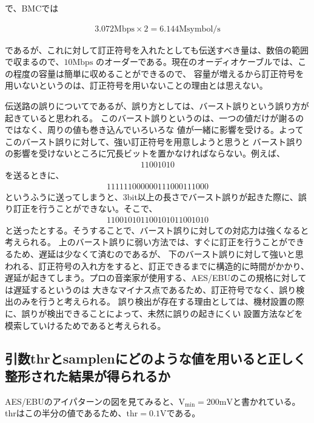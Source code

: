 \documentclass[11pt,a4j]{jsarticle}
\begin{document}
で、BMCでは

\begin{align*}
	3.072 \mathrm{Mbps} \times 2 = 6.144 \mathrm{Msymbol/s}
\end{align*}

であるが、これに対して訂正符号を入れたとしても伝送すべき量は、数倍の範囲で収まるので、$10 \mathrm{Mbps}$
のオーダーである。現在のオーディオケーブルでは、この程度の容量は簡単に収めることができるので、
容量が増えるから訂正符号を用いないというのは、訂正符号を用いないことの理由とは思えない。

伝送路の誤りについてであるが、誤り方としては、バースト誤りという誤り方が起きていると思われる。
このバースト誤りというのは、一つの値だけが謝るのではなく、周りの値も巻き込んでいろいろな
値が一緒に影響を受ける。よってこのバースト誤りに対して、強い訂正符号を用意しようと思うと
バースト誤りの影響を受けないところに冗長ビットを置かなければならない。例えば、
\begin{align*}
	11001010
\end{align*}
を送るときに、
\begin{align*}
	111 111 000 000 111 000 111 000
\end{align*}
というふうに送ってしまうと、3bit以上の長さでバースト誤りが起きた際に、誤り訂正を行うことができない。そこで、
\begin{align*}
	11001010 11001010 11001010
\end{align*}
と送ったとする。そうすることで、バースト誤りに対しての対応力は強くなると考えられる。
上のバースト誤りに弱い方法では、すぐに訂正を行うことができるため、遅延は少なくて済むのであるが、
下のバースト誤りに対して強いと思われる、訂正符号の入れ方をすると、訂正できるまでに構造的に時間がかかり、
遅延が起きてしまう。プロの音楽家が使用する、AES/EBUのこの規格に対しては遅延するというのは
大きなマイナス点であるため、訂正符号でなく、誤り検出のみを行うと考えられる。
誤り検出が存在する理由としては、機材設置の際に、誤りが検出できることによって、未然に誤りの起きにくい
設置方法などを模索していけるためであると考えられる。


\subsection{引数thrとsamplenにどのような値を用いると正しく整形された結果が得られるか}
\label{sub:引数thrとsamplen}

AES/EBUのアイパターンの図を見てみると、$\mathrm{V_{min}} = 200 \mathrm{mV}$と書かれている。
thrはこの半分の値であるため、$\mathrm{thr} = 0.1 \mathrm{V}$である。
\end{document}
